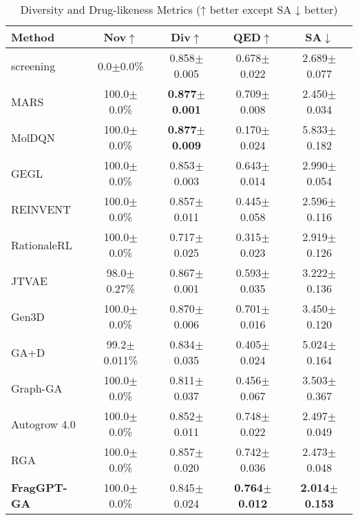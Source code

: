 \documentclass[lettersize,journal]{IEEEtran}
\begin{document}
\begin{table}[!t]
    \caption{Diversity and Drug-likeness Metrics (↑ better except SA ↓ better)}
    \label{tab:diversity_metrics}
    \centering    
    \small
    \setlength{\tabcolsep}{4pt}
    
    \begin{tabular}{l c c c c}
        \hline\hline
        Method & Nov$\uparrow$ & Div$\uparrow$ & QED$\uparrow$ & SA$\downarrow$ \\
        \hline
        screening & 0.0$\pm$0.0\% & 0.858$\pm$0.005 & 0.678$\pm$0.022 & 2.689$\pm$0.077 \\
        MARS & 100.0$\pm$0.0\% & \textbf{0.877}$\pm$\textbf{0.001} & 0.709$\pm$0.008 & 2.450$\pm$0.034 \\
            MolDQN & 100.0$\pm$0.0\% & \textbf{0.877}$\pm$\textbf{0.009} & 0.170$\pm$0.024 & 5.833$\pm$0.182 \\
        GEGL & 100.0$\pm$0.0\% & 0.853$\pm$0.003 & 0.643$\pm$0.014 & 2.990$\pm$0.054 \\
        REINVENT & 100.0$\pm$0.0\% & 0.857$\pm$0.011 & 0.445$\pm$0.058 & 2.596$\pm$0.116 \\
        RationaleRL & 100.0$\pm$0.0\% & 0.717$\pm$0.025 & 0.315$\pm$0.023 & 2.919$\pm$0.126 \\
        JTVAE & 98.0$\pm$0.27\% & 0.867$\pm$0.001 & 0.593$\pm$0.035 & 3.222$\pm$0.136 \\
        Gen3D & 100.0$\pm$0.0\% & 0.870$\pm$0.006 & 0.701$\pm$0.016 & 3.450$\pm$0.120 \\
        GA+D & 99.2$\pm$0.011\% & 0.834$\pm$0.035 & 0.405$\pm$0.024 & 5.024$\pm$0.164 \\
        Graph-GA & 100.0$\pm$0.0\% & 0.811$\pm$0.037 & 0.456$\pm$0.067 & 3.503$\pm$0.367 \\
        Autogrow 4.0 & 100.0$\pm$0.0\% & 0.852$\pm$0.011 & 0.748$\pm$0.022 & 2.497$\pm$0.049 \\
        RGA  & 100.0$\pm$0.0\% & 0.857$\pm$0.020 & 0.742$\pm$0.036 & 2.473$\pm$0.048 \\                 
        \hline
        \textbf{FragGPT-GA} & 100.0$\pm$0.0\% & 0.845$\pm$0.024 & \textbf{0.764$\pm$0.012} & \textbf{2.014$\pm$0.153} \\            
        \hline\hline
    \end{tabular}
\end{table}
\end{document}
